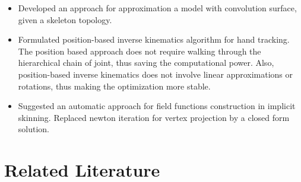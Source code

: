 \documentclass[10pt,journal,a4paper]{IEEEtran}
\begin{document}
\begin{itemize}

\item Developed an approach for approximation a model with convolution surface, given a skeleton topology.
\item Formulated position-based inverse kinematics algorithm for hand tracking. The position based approach does not require walking through the hierarchical chain of joint, thus saving the computational power. Also, position-based inverse kinematics does not involve linear approximations or rotations, thus making the optimization more stable.
\item Suggested an automatic approach for field functions construction in implicit skinning.  \textcolor{mygray}{Replaced newton iteration for vertex projection by a closed form solution.}

\end{itemize}



\section{Related Literature}
\end{document}

